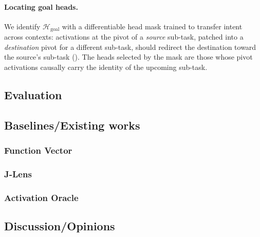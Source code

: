 \paragraph{Locating goal heads.} We identify $\mathcal{H}_{\text{goal}}$ with a differentiable head mask trained to transfer intent across contexts: activations at the pivot of a \emph{source} sub-task, patched into a \emph{destination} pivot for a different sub-task, should redirect the destination toward the source's sub-task (). The heads selected by the mask are those whose pivot activations causally carry the identity of the upcoming sub-task. 

\subsection{Evaluation}

\subsection{Baselines/Existing works}

\subsubsection{Function Vector}

\subsubsection{J-Lens}

\subsubsection{Activation Oracle}

\subsection{Discussion/Opinions}
